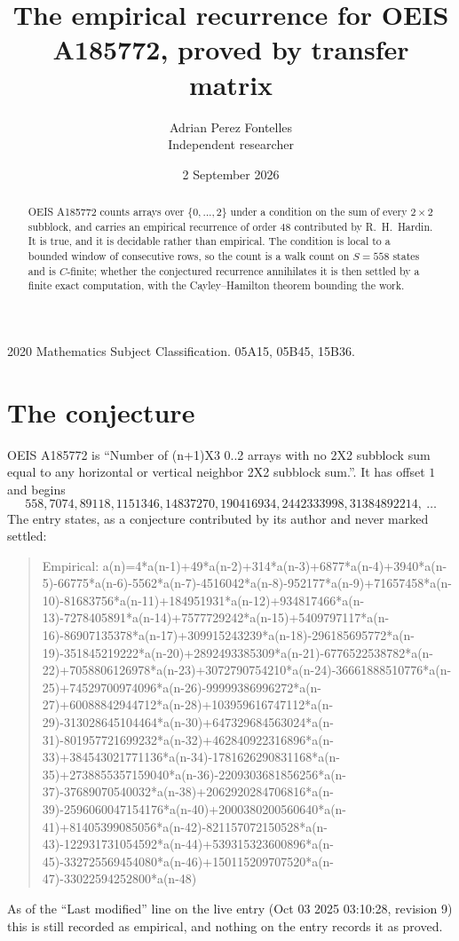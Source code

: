 \documentclass[11pt,a4paper]{article}
\title{The empirical recurrence for OEIS A185772, proved by transfer matrix}
\author{Adrian Perez Fontelles\\ \small Independent researcher}
\date{2 September 2026}
\theoremstyle{plain}
\theoremstyle{definition}
\begin{document}
\maketitle

\begin{abstract}
OEIS A185772 counts arrays over $\{0,\dots,2\}$ under a condition on the sum of every
$2\times2$ subblock, and carries an empirical recurrence of order $48$ contributed by
R.~H.~Hardin. It is true, and it is decidable rather than empirical. The condition is local to
a bounded window of consecutive rows, so the count is a walk count on $S=558$ states and is
$C$-finite; whether the conjectured recurrence annihilates it is then settled by a finite exact
computation, with the Cayley--Hamilton theorem bounding the work.
\end{abstract}

\noindent\small 2020 Mathematics Subject Classification. 05A15, 05B45, 15B36.\normalsize

\section{The conjecture}

OEIS A185772 is ``Number of (n+1)X3 0..2 arrays with no 2X2 subblock sum equal to any horizontal or vertical neighbor 2X2 subblock sum.''. It has offset $1$ and begins
\[
558, 7074, 89118, 1151346, 14837270, 190416934, 2442333998, 31384892214,\ \dots
\]
The entry states, as a conjecture contributed by its author and never marked settled:
\begin{quote}
Empirical: a(n)=4*a(n-1)+49*a(n-2)+314*a(n-3)+6877*a(n-4)+3940*a(n-5)-66775*a(n-6)-5562*a(n-7)-4516042*a(n-8)-952177*a(n-9)+71657458*a(n-10)-81683756*a(n-11)+184951931*a(n-12)+934817466*a(n-13)-7278405891*a(n-14)+7577729242*a(n-15)+5409797117*a(n-16)-86907135378*a(n-17)+309915243239*a(n-18)-296185695772*a(n-19)-351845219222*a(n-20)+2892493385309*a(n-21)-6776522538782*a(n-22)+7058806126978*a(n-23)+3072790754210*a(n-24)-36661888510776*a(n-25)+74529700974096*a(n-26)-99999386996272*a(n-27)+60088842944712*a(n-28)+103959616747112*a(n-29)-313028645104464*a(n-30)+647329684563024*a(n-31)-801957721699232*a(n-32)+462840922316896*a(n-33)+384543021771136*a(n-34)-1781626290831168*a(n-35)+2738855357159040*a(n-36)-2209303681856256*a(n-37)-37689070540032*a(n-38)+2062920284706816*a(n-39)-2596060047154176*a(n-40)+2000380200560640*a(n-41)+81405399085056*a(n-42)-821157072150528*a(n-43)-122931731054592*a(n-44)+539315323600896*a(n-45)-332725569454080*a(n-46)+150115209707520*a(n-47)-33022594252800*a(n-48)
\end{quote}
As of the ``Last modified'' line on the live entry (Oct 03 2025 03:10:28, revision 9) this is still
recorded as empirical, and nothing on the entry records it as proved.
\end{document}
